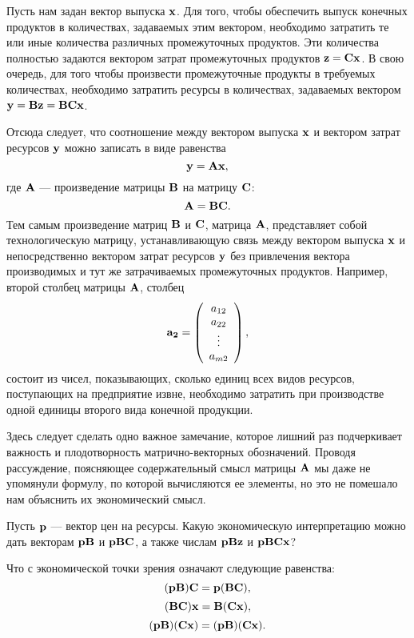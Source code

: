     Пусть нам задан вектор выпуска $\mathbf{x}$. Для того, чтобы
    обеспечить выпуск конечных продуктов в количествах, задаваемых
    этим вектором, необходимо затратить те или иные количества
    различных промежуточных продуктов. Эти количества полностью
    задаются вектором затрат промежуточных продуктов
    $\mathbf{z}=\mathbf{C}\mathbf{x}$. В свою очередь, для того чтобы произвести
    промежуточные продукты в требуемых количествах, необходимо
    затратить ресурсы в количествах, задаваемых вектором
    $\mathbf{y}=\mathbf{B}\mathbf{z}=\mathbf{B}\mathbf{C}\mathbf{x}$.

    Отсюда следует, что соотношение между вектором выпуска $\mathbf{x}$
    и вектором затрат ресурсов $\mathbf{y}$ можно записать в виде
    равенства
    \[\mathbf{y}=\mathbf{A}\mathbf{x},\]
    где $\mathbf{A}$ --- произведение матрицы $\mathbf{B}$ на матрицу
    $\mathbf{C}$:
    \[\mathbf{A}=\mathbf{B}\mathbf{C}.\]
    Тем самым произведение матриц $\mathbf{B}$ и $\mathbf{C}$,
    матрица $\mathbf{A}$, представляет собой
    технологическую матрицу, устанавливающую связь между вектором
    выпуска $\mathbf{x}$ и непосредственно вектором затрат ресурсов
    $\mathbf{y}$ без привлечения вектора производимых и тут же
    затрачиваемых промежуточных продуктов. Например, второй столбец
    матрицы $\mathbf{A}$, столбец
        \[\mathbf{a_{2}}=\left(
     \begin{array}{c}
        a_{12} \\
        a_{22} \\
        \vdots \\
        a_{m2}  \\
      \end{array}
    \right),\]
    состоит из чисел, показывающих, сколько единиц всех видов
    ресурсов, поступающих на предприятие извне, необходимо затратить
    при производстве одной единицы второго вида конечной продукции.

    Здесь следует сделать одно важное замечание, которое лишний раз
    подчеркивает важность и плодотворность матрично-векторных
    обозначений. Проводя рассуждение, поясняющее содержательный
    смысл матрицы $\mathbf{A}$ мы даже не упомянули формулу, по которой
    вычисляются ее элементы, но это не помешало нам объяснить их
    экономический смысл.

\begin{exer}
    Пусть $\mathbf{p}$ --- вектор цен на ресурсы. Какую экономическую
    интерпретацию можно дать векторам $\mathbf{p}\mathbf{B}$ и $\mathbf{p}\mathbf{B}\mathbf{C}$,
    а также числам $\mathbf{p}\mathbf{B}\mathbf{z}$ и
    $\mathbf{p}\mathbf{B}\mathbf{C}\mathbf{x}$?
\end{exer}
\begin{exer}
    Что с экономической точки зрения
    означают следующие равенства:
    \[(\mathbf{p}\mathbf{B})\mathbf{C}=\mathbf{p}(\mathbf{B}\mathbf{C}),\]
    \[(\mathbf{B}\mathbf{C})\mathbf{x}=\mathbf{B}(\mathbf{C}\mathbf{x}),\]
    \[(\mathbf{p}\mathbf{B})(\mathbf{C}\mathbf{x})=(\mathbf{p}\mathbf{B})(\mathbf{C}\mathbf{x}).\]
\end{exer}

